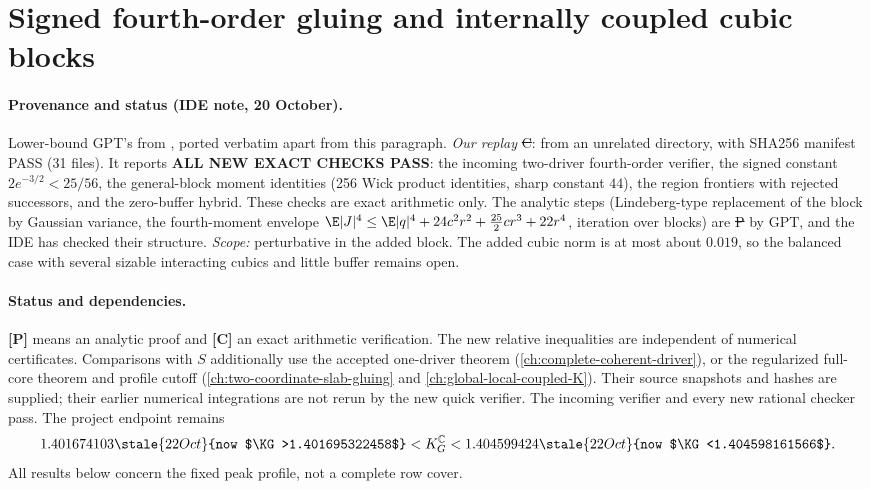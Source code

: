 \section{Signed fourth-order gluing and internally coupled cubic blocks}
\label{ch:signed-fourth-order-gluing}

\paragraph{Provenance and status (IDE note, 20 October).} Lower-bound GPT's  from , ported verbatim
apart from this paragraph. \emph{Our replay} \st{C}:  from an unrelated directory, with SHA256 manifest PASS (31 files). It reports \textbf{ALL NEW EXACT CHECKS PASS}:
the incoming two-driver fourth-order verifier, the signed constant $2e^{-3/2}<25/56$, the general-block moment identities (256 Wick product identities, sharp constant $44$), the region frontiers with rejected
successors, and the zero-buffer hybrid. These checks are exact arithmetic only. The analytic steps (Lindeberg-type replacement of the block by Gaussian variance, the fourth-moment envelope
$\E|J|^4\le\E|q|^4+24c^2r^2+\frac{25}2cr^3+22r^4$, iteration over blocks) are \st{P} by GPT, and the IDE has checked their structure. \emph{Scope:} perturbative in the added block. The
added cubic norm is at most about $0.019$, so the balanced case with several sizable interacting cubics and little buffer remains open.


\paragraph{Status and dependencies.}
\textbf{[P]} means an analytic proof and \textbf{[C]} an exact arithmetic
verification. The new relative inequalities are independent of numerical
certificates. Comparisons with \(S\) additionally use the accepted
one-driver theorem (\autoref{ch:complete-coherent-driver}), or the regularized full-core theorem
and profile cutoff (\autoref{ch:two-coordinate-slab-gluing} and \autoref{ch:global-local-coupled-K}). Their source snapshots and
hashes are supplied; their earlier numerical integrations are not rerun
by the new quick verifier.
The incoming verifier and every new rational checker pass.
The project endpoint remains
\[
 1.401674103\stale{22 Oct}{now $\KG>1.401695322458$}<K_G^{\mathbb C}<1.404599424\stale{22 Oct}{now $\KG<1.404598161566$}.
\]
All results below concern the fixed peak profile, not a complete row cover.

